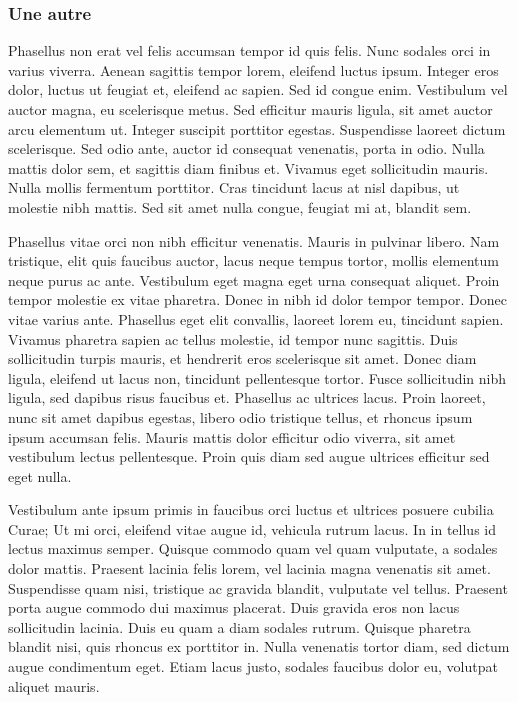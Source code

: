 \documentclass[10pt,fleqn]{article} %
\begin{document}
\subsubsection{Une autre}
Phasellus non erat vel felis accumsan tempor id quis felis. Nunc sodales orci in varius viverra. Aenean sagittis tempor lorem, eleifend luctus ipsum. Integer eros dolor, luctus ut feugiat et, eleifend ac sapien. Sed id congue enim. Vestibulum vel auctor magna, eu scelerisque metus. Sed efficitur mauris ligula, sit amet auctor arcu elementum ut. Integer suscipit porttitor egestas. Suspendisse laoreet dictum scelerisque. Sed odio ante, auctor id consequat venenatis, porta in odio. Nulla mattis dolor sem, et sagittis diam finibus et. Vivamus eget sollicitudin mauris. Nulla mollis fermentum porttitor. Cras tincidunt lacus at nisl dapibus, ut molestie nibh mattis. Sed sit amet nulla congue, feugiat mi at, blandit sem. 

Phasellus vitae orci non nibh efficitur venenatis. Mauris in pulvinar libero. Nam tristique, elit quis faucibus auctor, lacus neque tempus tortor, mollis elementum neque purus ac ante. Vestibulum eget magna eget urna consequat aliquet. Proin tempor molestie ex vitae pharetra. Donec in nibh id dolor tempor tempor. Donec vitae varius ante. Phasellus eget elit convallis, laoreet lorem eu, tincidunt sapien. Vivamus pharetra sapien ac tellus molestie, id tempor nunc sagittis. Duis sollicitudin turpis mauris, et hendrerit eros scelerisque sit amet. Donec diam ligula, eleifend ut lacus non, tincidunt pellentesque tortor. Fusce sollicitudin nibh ligula, sed dapibus risus faucibus et. Phasellus ac ultrices lacus. Proin laoreet, nunc sit amet dapibus egestas, libero odio tristique tellus, et rhoncus ipsum ipsum accumsan felis. Mauris mattis dolor efficitur odio viverra, sit amet vestibulum lectus pellentesque. Proin quis diam sed augue ultrices efficitur sed eget nulla.

Vestibulum ante ipsum primis in faucibus orci luctus et ultrices posuere cubilia Curae; Ut mi orci, eleifend vitae augue id, vehicula rutrum lacus. In in tellus id lectus maximus semper. Quisque commodo quam vel quam vulputate, a sodales dolor mattis. Praesent lacinia felis lorem, vel lacinia magna venenatis sit amet. Suspendisse quam nisi, tristique ac gravida blandit, vulputate vel tellus. Praesent porta augue commodo dui maximus placerat. Duis gravida eros non lacus sollicitudin lacinia. Duis eu quam a diam sodales rutrum. Quisque pharetra blandit nisi, quis rhoncus ex porttitor in. Nulla venenatis tortor diam, sed dictum augue condimentum eget. Etiam lacus justo, sodales faucibus dolor eu, volutpat aliquet mauris.
\end{document}
